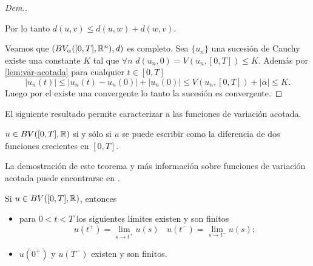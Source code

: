 \begin{proof}[Dem.]
{\begin{itemize}
Por lo tanto $d(u,v)\leq d(u,w)+d(w,v)$.
    \end{itemize}
Veamos que $\left(BV_\alpha([0,T],\mathbb{R}^n),d\right)$ es completo. Sea $\{u_n\}$ una sucesión de Cauchy existe una constante $K$ tal que $\forall n$ $d(u_n,0)=V(u_n,[0,T])\leq K$. Además por  \ref{lem:var-acotada} para cualquier $t\in[0,T]$
\begin{equation} \label{eq:desigualdad d}
|u_n(t)|\leq|u_n(t)-u_n(0)|+|u_n(0)|\leq V(u_n,[0,T])+|\alpha|\leq K.
\end{equation}
Luego por el  
existe una  convergente lo tanto la sucesión es convergente.
}
\end{proof}







El siguiente resultado permite caracterizar a las funciones de variación acotada.

\begin{thm}\label{T-VB} 
	 $u\in BV([0,T],\mathbb{R})$ si y sólo si $u$ se puede escribir como la diferencia de dos funciones crecientes en $[0,T]$.
\end{thm}

La demostración de este teorema y más información sobre funciones de variación acotada puede encontrarse en \cite{Carter}. %
\begin{cor}
	Si $u\in BV([0,T],\mathbb{R})$, entonces 
	\begin{itemize}
		\item para $0<t<T$ los siguientes límites existen y son finitos
		$$u(t^+)=\lim\limits_{s\to t^+}u(s) \ \ \ \ u(t^-)=\lim\limits_{s\to t^-}u(s);$$
		\item $u(0^+)$ y $u(T^-)$ existen y son finitos.
	\end{itemize}
\end{cor}






